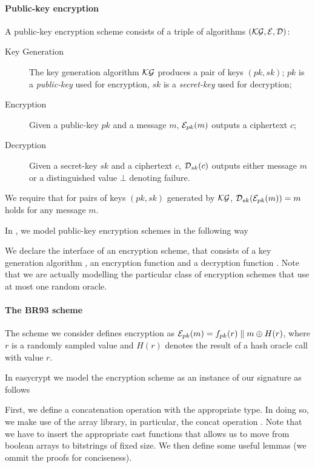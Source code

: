 \paragraph{Public-key encryption}
A public-key encryption scheme consists of a triple of algorithms
$(\mathcal{KG},\mathcal{E},\mathcal{D})$:

\begin{description}
\item[Key Generation] 
  The key generation algorithm $\mathcal{KG}$ produces a pair of keys $(pk,sk)$;
  $pk$ is a \emph{public-key} used for encryption, $sk$ is
  a \emph{secret-key} used for decryption;

\item[Encryption] 
  Given a public-key $pk$ and a message $m$, $\mathcal{E}_{pk}(m)$ outputs a
  ciphertext $c$;

\item[Decryption] 
  Given a secret-key $sk$ and a ciphertext $c$, $\mathcal{D}_{sk}(c)$ outputs
  either message $m$ or a distinguished value $\bot$ denoting failure.
\end{description}
%
We require that for pairs of keys $(pk,sk)$ generated by $\mathcal{KG}$,
$\mathcal{D}_{sk}(\mathcal{E}_{pk}(m))= m$ holds for any message $m$. 

In \EC, we model public-key encryption schemes in the following way


We declare the interface of an encryption scheme, that consists of a
key generation algorithm , an encryption function  and
a decryption function . Note that we are actually modelling
the particular class of encryption schemes that use at most one random
oracle.

\paragraph{The BR93 scheme}
The scheme we consider defines encryption as 
$\mathcal{E}_{pk}(m) = f_{pk}(r) \parallel m \oplus H(r)$, where $r$ is a
randomly sampled value and $H(r)$ denotes the result of a hash oracle
call with value $r$.

 In easycrypt we model the encryption scheme as an instance of our
  signature as follows


First, we define a concatenation operation with the appropriate
type. In doing so, we make use of the array library, in particular,
the concat operation \ec{||}. Note that we have to insert the
appropriate cast functions that allows us to move from boolean arrays
to bitstrings of fixed size. We then define some useful lemmas (we
ommit the proofs for conciseness).

